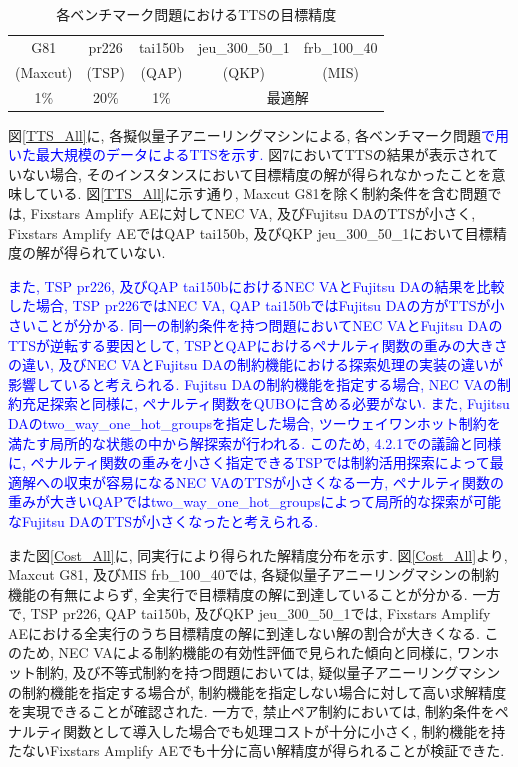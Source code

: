 \documentclass[submit,techrep,noauthor]{ipsj}
\begin{document}
\begin{table}[tb]
\centering
  \caption{各ベンチマーク問題におけるTTSの目標精度}
    \begin{tabular}{|c|c|c|c|c|}
      \hline
      G81 & pr226 & tai150b & jeu\_300\_50\_1 & frb\_100\_40\\
      (Maxcut) & (TSP) & (QAP) & (QKP) & (MIS)\\
      \cline{1-1} \cline{2-2} \cline{3-3} \cline{4-4} \cline{5-5}
       1\% & 20\% & 1\% & \multicolumn{2}{|c|}{最適解}\\ \hline
    \end{tabular}
\label{table_target2}
\end{table}

図\ref{TTS_All}に, 各擬似量子アニーリングマシンによる, 各ベンチマーク問題\textcolor{blue}{で用いた最大規模のデータによるTTSを示す.} 図7においてTTSの結果が表示されていない場合, そのインスタンスにおいて目標精度の解が得られなかったことを意味している. 図\ref{TTS_All}に示す通り, Maxcut G81を除く制約条件を含む問題では, Fixstars Amplify AEに対してNEC VA, 及びFujitsu DAのTTSが小さく, Fixstars Amplify AEではQAP tai150b, 及びQKP jeu\_300\_50\_1において目標精度の解が得られていない. 

\textcolor{blue}{また, TSP pr226, 及びQAP tai150bにおけるNEC VAとFujitsu DAの結果を比較した場合, TSP pr226ではNEC VA, QAP tai150bではFujitsu DAの方がTTSが小さいことが分かる. 同一の制約条件を持つ問題においてNEC VAとFujitsu DAのTTSが逆転する要因として, TSPとQAPにおけるペナルティ関数の重みの大きさの違い, 及びNEC VAとFujitsu DAの制約機能における探索処理の実装の違いが影響していると考えられる. Fujitsu DAの制約機能を指定する場合, NEC VAの制約充足探索と同様に, ペナルティ関数をQUBOに含める必要がない. また, Fujitsu DAのtwo\_way\_one\_hot\_groupsを指定した場合, ツーウェイワンホット制約を満たす局所的な状態の中から解探索が行われる. このため, 4.2.1での議論と同様に, ペナルティ関数の重みを小さく指定できるTSPでは制約活用探索によって最適解への収束が容易になるNEC VAのTTSが小さくなる一方, ペナルティ関数の重みが大きいQAPではtwo\_way\_one\_hot\_groupsによって局所的な探索が可能なFujitsu DAのTTSが小さくなったと考えられる.}

また図\ref{Cost_All}に, 同実行により得られた解精度分布を示す. 図\ref{Cost_All}より, Maxcut G81, 及びMIS frb\_100\_40では, 各疑似量子アニーリングマシンの制約機能の有無によらず, 全実行で目標精度の解に到達していることが分かる. 一方で, TSP pr226, QAP tai150b, 及びQKP jeu\_300\_50\_1では, Fixstars Amplify AEにおける全実行のうち目標精度の解に到達しない解の割合が大きくなる. このため, NEC VAによる制約機能の有効性評価で見られた傾向と同様に, ワンホット制約, 及び不等式制約を持つ問題においては, 疑似量子アニーリングマシンの制約機能を指定する場合が, 制約機能を指定しない場合に対して高い求解精度を実現できることが確認された. 一方で, 禁止ペア制約においては, 制約条件をペナルティ関数として導入した場合でも処理コストが十分に小さく, 制約機能を持たないFixstars Amplify AEでも十分に高い解精度が得られることが検証できた. 
\end{document}
